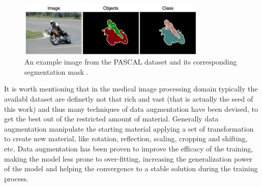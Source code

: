     \begin{figure}
        \centering
        \includegraphics[width = 0.8\textwidth]{images/PASCAL}
        \caption{An example image from the PASCAL dataset and its corresponding segmentation mask \cite{PASCAL}.}
        \label{fig:PASCAL}
    \end{figure}

It is worth mentioning that in the medical image processing domain typically the availabl dataset are definetly not that rich and vast (that is actually the seed of this work) and thus many techniques of data augmentation have been devised, to get the best out of the restricted amount of material. Generally data augmentation manipulate the starting material applying a set of transformation to create new material, like rotation, reflection, scaling, cropping and shifting, etc. Data augmentation has been proven to improve the efficacy of the training, making the model less prone to over-fitting, increasing the generalization power of the model and helping the convergence to a stable solution during the training process.
